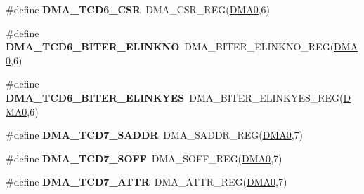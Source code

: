 \begin{DoxyCompactItemize}
\item 
\#define {\bfseries D\+M\+A\+\_\+\+T\+C\+D6\+\_\+\+C\+SR}~D\+M\+A\+\_\+\+C\+S\+R\+\_\+\+R\+EG(\hyperlink{group__DMA__Peripheral__Access__Layer_ga4103044f9ca209772f513dc694513ffb}{D\+M\+A0},6)\hypertarget{group__DMA__Register__Accessor__Macros_gaafd4e9ae86d78c4a625a97dbf5871935}{}\label{group__DMA__Register__Accessor__Macros_gaafd4e9ae86d78c4a625a97dbf5871935}

\item 
\#define {\bfseries D\+M\+A\+\_\+\+T\+C\+D6\+\_\+\+B\+I\+T\+E\+R\+\_\+\+E\+L\+I\+N\+K\+NO}~D\+M\+A\+\_\+\+B\+I\+T\+E\+R\+\_\+\+E\+L\+I\+N\+K\+N\+O\+\_\+\+R\+EG(\hyperlink{group__DMA__Peripheral__Access__Layer_ga4103044f9ca209772f513dc694513ffb}{D\+M\+A0},6)\hypertarget{group__DMA__Register__Accessor__Macros_ga48649fc22420475f667d80c10c46ed68}{}\label{group__DMA__Register__Accessor__Macros_ga48649fc22420475f667d80c10c46ed68}

\item 
\#define {\bfseries D\+M\+A\+\_\+\+T\+C\+D6\+\_\+\+B\+I\+T\+E\+R\+\_\+\+E\+L\+I\+N\+K\+Y\+ES}~D\+M\+A\+\_\+\+B\+I\+T\+E\+R\+\_\+\+E\+L\+I\+N\+K\+Y\+E\+S\+\_\+\+R\+EG(\hyperlink{group__DMA__Peripheral__Access__Layer_ga4103044f9ca209772f513dc694513ffb}{D\+M\+A0},6)\hypertarget{group__DMA__Register__Accessor__Macros_ga6fb4f9b6a33d34236f2d0dbaabbe44b1}{}\label{group__DMA__Register__Accessor__Macros_ga6fb4f9b6a33d34236f2d0dbaabbe44b1}

\item 
\#define {\bfseries D\+M\+A\+\_\+\+T\+C\+D7\+\_\+\+S\+A\+D\+DR}~D\+M\+A\+\_\+\+S\+A\+D\+D\+R\+\_\+\+R\+EG(\hyperlink{group__DMA__Peripheral__Access__Layer_ga4103044f9ca209772f513dc694513ffb}{D\+M\+A0},7)\hypertarget{group__DMA__Register__Accessor__Macros_ga2c17a6742312a4098c6492219ff8807e}{}\label{group__DMA__Register__Accessor__Macros_ga2c17a6742312a4098c6492219ff8807e}

\item 
\#define {\bfseries D\+M\+A\+\_\+\+T\+C\+D7\+\_\+\+S\+O\+FF}~D\+M\+A\+\_\+\+S\+O\+F\+F\+\_\+\+R\+EG(\hyperlink{group__DMA__Peripheral__Access__Layer_ga4103044f9ca209772f513dc694513ffb}{D\+M\+A0},7)\hypertarget{group__DMA__Register__Accessor__Macros_gae369bbdf8d7426f5285a701adc541862}{}\label{group__DMA__Register__Accessor__Macros_gae369bbdf8d7426f5285a701adc541862}

\item 
\#define {\bfseries D\+M\+A\+\_\+\+T\+C\+D7\+\_\+\+A\+T\+TR}~D\+M\+A\+\_\+\+A\+T\+T\+R\+\_\+\+R\+EG(\hyperlink{group__DMA__Peripheral__Access__Layer_ga4103044f9ca209772f513dc694513ffb}{D\+M\+A0},7)\hypertarget{group__DMA__Register__Accessor__Macros_ga948cb5ad1adb59b3c6b0560f2529efbe}{}\label{group__DMA__Register__Accessor__Macros_ga948cb5ad1adb59b3c6b0560f2529efbe}


\end{DoxyCompactItemize}
